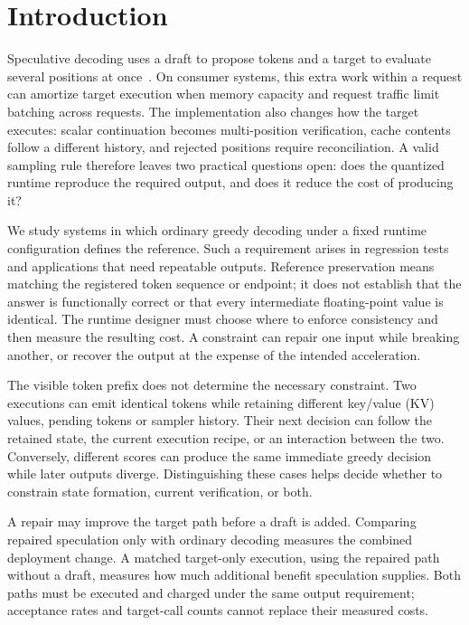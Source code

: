 \section{Introduction}
\label{sec:introduction}
Speculative decoding uses a draft to propose tokens and a target to evaluate several positions at once~\cite{leviathan2023}. On consumer systems, this extra work within a request can amortize target execution when memory capacity and request traffic limit batching across requests. The implementation also changes how the target executes: scalar continuation becomes multi-position verification, cache contents follow a different history, and rejected positions require reconciliation. A valid sampling rule therefore leaves two practical questions open: does the quantized runtime reproduce the required output, and does it reduce the cost of producing it?

We study systems in which ordinary greedy decoding under a fixed runtime configuration defines the reference. Such a requirement arises in regression tests and applications that need repeatable outputs. Reference preservation means matching the registered token sequence or endpoint; it does not establish that the answer is functionally correct or that every intermediate floating-point value is identical. The runtime designer must choose where to enforce consistency and then measure the resulting cost. A constraint can repair one input while breaking another, or recover the output at the expense of the intended acceleration.

The visible token prefix does not determine the necessary constraint. Two executions can emit identical tokens while retaining different key/value (KV) values, pending tokens or sampler history. Their next decision can follow the retained state, the current execution recipe, or an interaction between the two. Conversely, different scores can produce the same immediate greedy decision while later outputs diverge. Distinguishing these cases helps decide whether to constrain state formation, current verification, or both.

A repair may improve the target path before a draft is added. Comparing repaired speculation only with ordinary decoding measures the combined deployment change. A matched target-only execution, using the repaired path without a draft, measures how much additional benefit speculation supplies. Both paths must be executed and charged under the same output requirement; acceptance rates and target-call counts cannot replace their measured costs.

